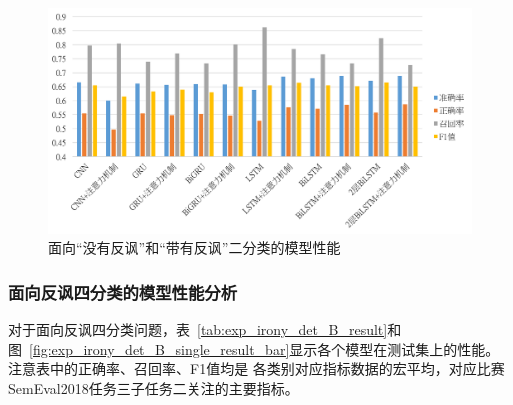 \begin{figure}[H]
  \centering
  \includegraphics[width=\textwidth]{img/exp_irony_det_A_single_result_bar.png}
  \caption{面向“没有反讽”和“带有反讽”二分类的模型性能}
  \label{fig:exp_irony_det_A_single_result_bar}
\end{figure}

\subsubsection{面向反讽四分类的模型性能分析}
\label{sssec:exp_irony_det_B_base}

对于面向反讽四分类问题，表~\ref{tab:exp_irony_det_B_result}和图~\ref{fig:exp_irony_det_B_single_result_bar}显示各个模型在测试集上的性能。注意表中的正确率、召回率、F1值均是
各类别对应指标数据的宏平均，对应比赛SemEval2018任务三子任务二关注的主要指标。

